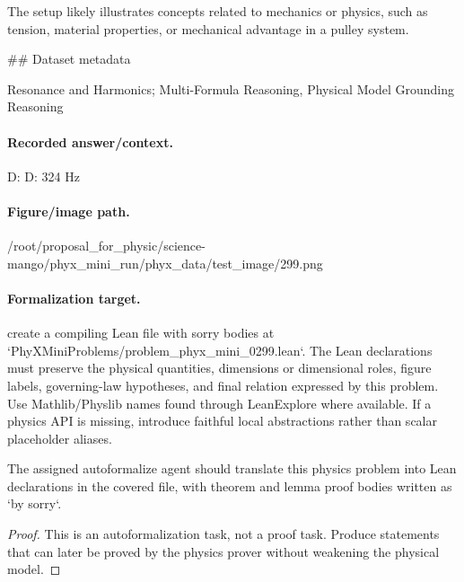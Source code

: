 The setup likely illustrates concepts related to mechanics or physics, such as tension, material properties, or mechanical advantage in a pulley system.

\#\# Dataset metadata

Resonance and Harmonics; Multi-Formula Reasoning, Physical Model Grounding Reasoning

\paragraph{Recorded answer/context.}
D: D: 324 Hz

\paragraph{Figure/image path.}
/root/proposal\_for\_physic/science-mango/phyx\_mini\_run/phyx\_data/test\_image/299.png

\paragraph{Formalization target.}
create a compiling Lean file with sorry bodies at `PhyXMiniProblems/problem\_phyx\_mini\_0299.lean`. The Lean declarations must preserve the physical quantities, dimensions or dimensional roles, figure labels, governing-law hypotheses, and final relation expressed by this problem.
Use Mathlib/Physlib names found through LeanExplore where available. If a physics API is missing, introduce faithful local abstractions rather than scalar placeholder aliases.

\begin{theorem}
\label{thm:physics:phyx_mini_0299:target}
The assigned autoformalize agent should translate this physics problem into Lean declarations in the covered file, with theorem and lemma proof bodies written as `by sorry`.
\end{theorem}
\begin{proof}
This is an autoformalization task, not a proof task. Produce statements that can later be proved by the physics prover without weakening the physical model.
\end{proof}

